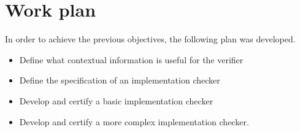 \section{Work plan}
\label{sect:work-plan}

In order to achieve the previous objectives, the following plan was developed.

\begin{itemize}
    \item Define what contextual information is useful for the verifier
    \item Define the specification of an implementation checker
    \item Develop and certify a basic implementation checker
    \item Develop and certify a more complex implementation checker.
\end{itemize}